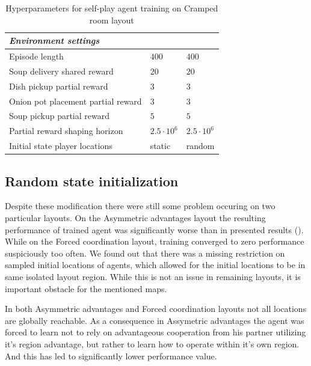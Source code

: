 \begin{table}[htbp]
\begin{tabular}{lll}
      \textit{Environment settings}                &                                   &                                   \\ \midrule                                
      Episode length                               & $400$                             & $400$                             \\
      Soup delivery shared reward                  & $20$                              & $20$                              \\
      Dish pickup partial reward                   & $3$                               & $3$                               \\
      Onion pot placement partial reward           & $3$                               & $3$                               \\
      Soup pickup partial reward                   & $5$                               & $5$                               \\
      Partial reward shaping horizon               & $2.5\cdot 10^6$                   & $2.5\cdot 10^6$                   \\
      Initial state player locations               & static                            & random                            \\
     \bottomrule
    \end{tabular}
    \caption{Hyperparameters for self-play agent training on Cramped room layout}
    \label{tab:hyperparameters-algo}
  \end{table}
  


\subsection{Random state initialization}
Despite these modification there were still some problem occuring on two particular layouts.
On the Asymmetric advantages layout the resulting performance of trained agent was significantly worse than in presented results (\cite{carroll2020utility}).
While on the Forced coordination layout, training converged to zero performance suspiciously too often.
We found out that there was a missing restriction on sampled initial locations of agents, which allowed for the initial locations to be in same isolated layout region.
While this is not an issue in remaining layouts, it is important obstacle for the mentioned maps.

In both Asymmetric advantages and Forced coordination layouts not all locations are globally reachable.
As a consequence in Assymetric advantages the agent was forced to learn not to rely on advantageous cooperation from his partner utilizing it's region advantage, but rather to learn how to operate within it's own region.
And this has led to significantly lower performance value.

